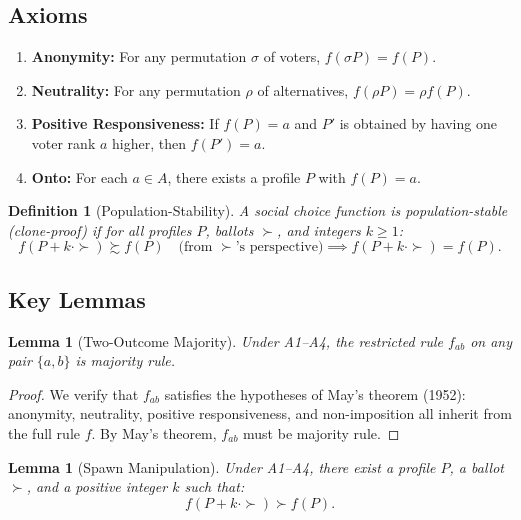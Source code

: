 \documentclass[12pt]{article}
\newtheorem{lemma}[theorem]{Lemma}
\newtheorem{definition}[theorem]{Definition}
\begin{document}
\subsection{Axioms}

\begin{enumerate}
    \item[\textbf{(A1)}] \textbf{Anonymity:} For any permutation $\sigma$ of voters, $f(\sigma P) = f(P)$.
    \item[\textbf{(A2)}] \textbf{Neutrality:} For any permutation $\rho$ of alternatives, $f(\rho P) = \rho f(P)$.
    \item[\textbf{(A3)}] \textbf{Positive Responsiveness:} If $f(P) = a$ and $P'$ is obtained by having one voter rank $a$ higher, then $f(P') = a$.
    \item[\textbf{(A4)}] \textbf{Onto:} For each $a \in A$, there exists a profile $P$ with $f(P) = a$.
\end{enumerate}

\begin{definition}[Population-Stability]
A social choice function is \emph{population-stable} (clone-proof) if for all profiles $P$, ballots $\succ$, and integers $k \geq 1$:
\[
f(P + k \cdot \succ) \succsim f(P) \quad \text{(from } \succ \text{'s perspective)} \implies f(P + k \cdot \succ) = f(P).
\]
\end{definition}

\subsection{Key Lemmas}

\begin{lemma}[Two-Outcome Majority]
\label{lem:two-outcome}
Under A1--A4, the restricted rule $f_{ab}$ on any pair $\{a, b\}$ is majority rule.
\end{lemma}

\begin{proof}
We verify that $f_{ab}$ satisfies the hypotheses of May's theorem (1952): anonymity, neutrality, positive responsiveness, and non-imposition all inherit from the full rule $f$. By May's theorem, $f_{ab}$ must be majority rule.
\end{proof}

\begin{lemma}[Spawn Manipulation]
\label{lem:spawn-manipulation}
Under A1--A4, there exist a profile $P$, a ballot $\succ$, and a positive integer $k$ such that:
\[
f(P + k \cdot \succ) \succ f(P).
\]
\end{lemma}
\end{document}
